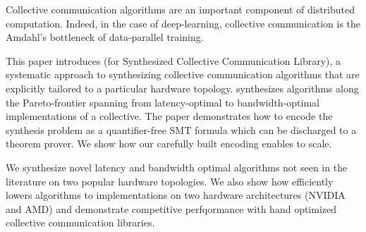 Collective communication algorithms are an important component of
distributed computation.  Indeed, in the case of deep-learning,
collective communication is the Amdahl's bottleneck of data-parallel
training.

This paper introduces \tool{} (for Synthesized Collective
Communication Library), a systematic approach to synthesizing collective
communication algorithms that are explicitly tailored to a particular
hardware topology.  \tool{} synthesizes algorithms along the
Pareto-frontier spanning from latency-optimal to bandwidth-optimal
implementations of a collective.  The paper demonstrates how to encode
the synthesis problem as a quantifier-free SMT formula which can be
discharged to a theorem prover. We show how our carefully built encoding enables
\tool{} to scale.

We synthesize novel latency and bandwidth optimal
algorithms not seen in the literature on two popular hardware
topologies. We also show how \tool{} efficiently lowers algorithms to
implementations on two hardware architectures (NVIDIA and AMD) and
demonstrate competitive perfqormance with hand optimized collective
communication libraries.
